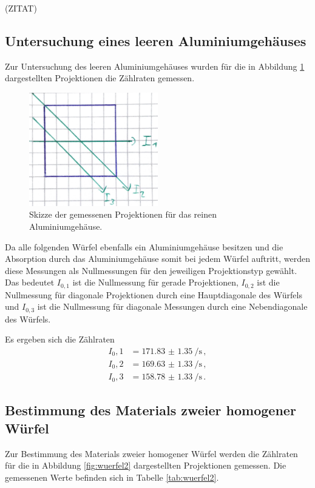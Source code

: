(ZITAT)

\subsection{Untersuchung eines leeren Aluminiumgehäuses}

Zur Untersuchung des leeren Aluminiumgehäuses wurden für die in Abbildung \ref{fig:wuerfel1} dargestellten Projektionen die Zählraten gemessen.

\begin{figure}
  \centering
  \includegraphics[width=0.5\textwidth]{images/wuerfel1.jpg}
  \caption{Skizze der gemessenen Projektionen für das reinen Aluminiumgehäuse.}
  \label{fig:wuerfel1}
\end{figure}

Da alle folgenden Würfel ebenfalls ein Aluminiumgehäuse besitzen und die Absorption durch das Aluminiumgehäuse somit bei jedem Würfel auftritt, werden
diese Messungen als Nullmessungen für den jeweiligen Projektionstyp gewählt. Das bedeutet $I_{0,1}$ ist die Nullmessung für gerade Projektionen,  $I_{0,2}$ ist die Nullmessung für diagonale Projektionen durch eine Hauptdiagonale des Würfels
und $I_{0,3}$ ist die Nullmessung für diagonale Messungen durch eine Nebendiagonale des Würfels.

Es ergeben sich die Zählraten
\begin{align*}
  I_0,1&=\SI{171.83(135)}{\per\second} \,, \\
  I_0,2&=\SI{169.63(133)}{\per\second} \,, \\
  I_0,3&=\SI{158.78(133)}{\per\second} \,.
\end{align*}

\subsection{Bestimmung des Materials zweier homogener Würfel}
Zur Bestimmung des Materials zweier homogener Würfel werden die Zählraten für die
in Abbildung \ref{fig:wuerfel2} dargestellten Projektionen gemessen. Die gemessenen Werte befinden sich in Tabelle \ref{tab:wuerfel2}.

